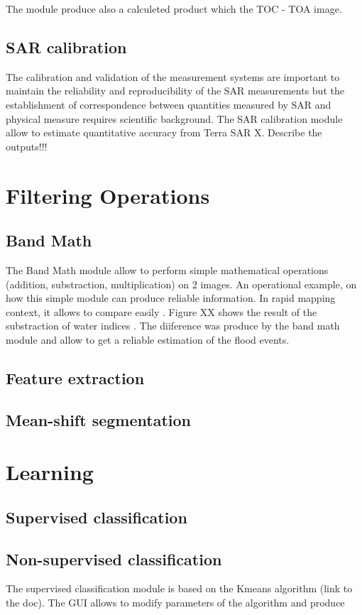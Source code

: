 \documentclass{InsightSoftwareGuide}
\begin{document}
The module produce also a calculeted product which the TOC - TOA image.

\subsection{SAR calibration}

The calibration and validation of the measurement systems are important to maintain the
reliability and reproducibility of the SAR measurements but the establishment of correspondence between quantities measured 
by SAR and physical measure requires scientific background. The SAR calibration module allow to estimate quantitative accuracy
from Terra SAR X.
Describe the outputs!!!

\section{Filtering Operations}
\subsection{Band Math}
The Band Math module allow to perform simple mathematical operations (addition, substraction, multiplication) on 2 images. 
An operational example, on how this simple module can produce reliable information.
In rapid mapping context, it allows to compare easily . Figure XX shows the result of the substraction of water indices . The diiference was produce by the band math module
and allow to get a reliable estimation of the flood events.
\subsection{Feature extraction}
\subsection{Mean-shift segmentation}
\section{Learning}
\subsection{Supervised classification}
\subsection{Non-supervised classification}
The supervised classification  module is based on the Kmeans algorithm (link to the doc).
The GUI allows to modify parameters of the algorithm and produce
\end{document}
